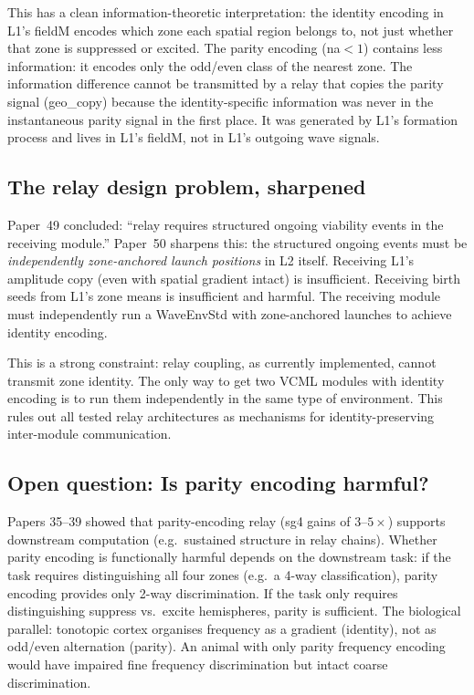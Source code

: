 \documentclass[11pt,a4paper]{article}
\begin{document}
This has a clean information-theoretic interpretation:
the identity encoding in L1's fieldM encodes which zone each spatial region belongs to,
not just whether that zone is suppressed or excited.
The parity encoding (na$<1$) contains less information: it encodes only the
odd/even class of the nearest zone.
The information difference cannot be transmitted by a relay that copies the parity
signal (geo\_copy) because the identity-specific information was never in the
instantaneous parity signal in the first place.
It was generated by L1's formation process and lives in L1's fieldM, not in L1's
outgoing wave signals.

\subsection{The relay design problem, sharpened}

Paper~49 concluded: ``relay requires structured ongoing viability events in the
receiving module.'' Paper~50 sharpens this: the structured ongoing events must be
\emph{independently zone-anchored launch positions} in L2 itself.
Receiving L1's amplitude copy (even with spatial gradient intact) is insufficient.
Receiving birth seeds from L1's zone means is insufficient and harmful.
The receiving module must independently run a WaveEnvStd with zone-anchored launches
to achieve identity encoding.

This is a strong constraint: relay coupling, as currently implemented, cannot transmit
zone identity. The only way to get two VCML modules with identity encoding is to run
them independently in the same type of environment.
This rules out all tested relay architectures as mechanisms for identity-preserving
inter-module communication.

\subsection{Open question: Is parity encoding harmful?}

Papers 35--39 showed that parity-encoding relay (sg4 gains of $3\text{--}5\times$)
supports downstream computation (e.g.\ sustained structure in relay chains).
Whether parity encoding is functionally harmful depends on the downstream task:
if the task requires distinguishing all four zones (e.g.\ a 4-way classification),
parity encoding provides only 2-way discrimination.
If the task only requires distinguishing suppress vs.\ excite hemispheres, parity
is sufficient.
The biological parallel: tonotopic cortex organises frequency as a gradient (identity),
not as odd/even alternation (parity).
An animal with only parity frequency encoding would have impaired fine frequency
discrimination but intact coarse discrimination.
\end{document}
